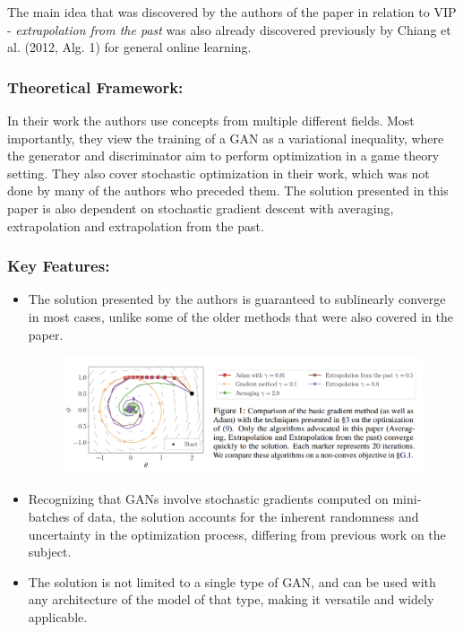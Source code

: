 \documentclass[11pt]{article}
\begin{document}
		The main idea that was discovered by the authors of the paper in relation to VIP - \textit{extrapolation from the past} was also already discovered previously by Chiang et al. (2012, Alg. 1) for general online learning.
		
		\subsubsection{Theoretical Framework:}
		In their work the authors use concepts from multiple different fields. Most importantly, they view the training of a GAN as a variational inequality, where the generator and discriminator aim to perform optimization in a game theory setting. They also cover stochastic optimization in their work, which was not done by many of the authors who preceded them. The solution presented in this paper is also dependent on stochastic gradient descent with averaging, extrapolation and extrapolation from the past.
		
		\subsubsection{Key Features:}
		\begin{itemize}
			\item The solution presented by the authors is guaranteed to sublinearly converge in most cases, unlike some of the older methods that were also covered in the paper.
			\begin{figure}[h]
				\centering
				\includegraphics[scale=0.7]{pictures/pic2.png}
				\label{fig:labe}
			\end{figure}
			\item Recognizing that GANs involve stochastic gradients computed on mini-batches of data, the solution accounts for the inherent randomness and uncertainty in the optimization process, differing from previous work on the subject.
			\item The solution is not limited to a single type of GAN, and can be used with any architecture of the model of that type, making it versatile and widely applicable.
		\end{itemize}
		
\end{document}
